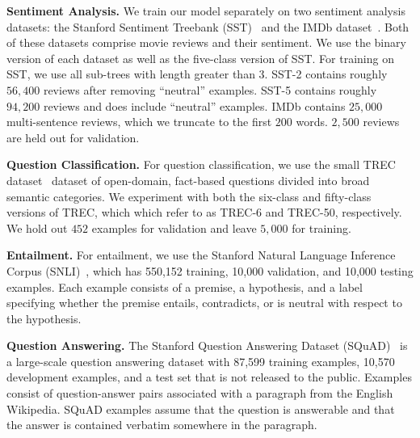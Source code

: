 \textbf{Sentiment Analysis.} 
We train our model separately on two sentiment analysis datasets: the Stanford Sentiment Treebank (SST)~\citep{Socher2013EMNLP} and the IMDb dataset~\citep{maas-EtAl:2011:ACL-HLT2011}.
Both of these datasets comprise movie reviews and their sentiment.
We use the binary version of each dataset as well as the five-class version of SST.
For training on SST, we use all sub-trees with length greater than $3$.
SST-2 contains roughly $56,400$ reviews after removing ``neutral'' examples. 
SST-5 contains roughly $94,200$ reviews and does include ``neutral'' examples.
IMDb contains $25,000$ multi-sentence reviews, which we truncate to the first $200$ words. $2,500$ reviews are held out for validation. 

\textbf{Question Classification.} 
For question classification, 
we use the small TREC dataset~\citep{voorhees1999trec} dataset of open-domain, fact-based questions divided into broad semantic categories.
We experiment with both the six-class and fifty-class versions of TREC,
which which refer to as TREC-6 and TREC-50, respectively.
We hold out $452$ examples for validation and leave $5,000$ for training.

\textbf{Entailment.}
For entailment, 
we use the Stanford Natural Language Inference Corpus (SNLI)~\citep{bowman2015snli}, 
which has 550,152 training, 
10,000 validation,
and 10,000 testing examples.
Each example consists of a premise, 
a hypothesis, 
and a label specifying whether the premise entails, contradicts, 
or is neutral with respect to the hypothesis.

\textbf{Question Answering.}
The Stanford Question Answering Dataset
(SQuAD)~\citep{rajpurkar2016squad} 
is a large-scale question answering dataset 
with 87,599 training examples,
10,570 development examples,
and a test set that is not released to the public.
Examples consist of question-answer pairs associated with a paragraph from the English Wikipedia.
SQuAD examples assume that the question is answerable and that the answer is contained verbatim somewhere in the paragraph.
